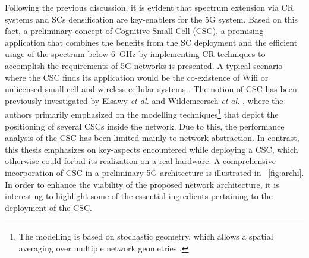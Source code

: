Following the previous discussion, it is evident that spectrum extension via CR systems and SCs densification are key-enablers for the 5G system.
Based on this fact, a preliminary concept of Cognitive Small Cell (CSC), a promising application that combines the benefits from the SC deployment and the efficient usage of the spectrum below \SI{6}{GHz} by implementing CR techniques to accomplish the requirements of 5G networks is presented. A typical scenario where the CSC finds its application would be the co-existence of Wifi or unlicensed small cell and wireless cellular systems \cite{Benn13, Gali15}. The notion of CSC has been previously investigated by Elsawy \textit{et al.} \cite{Elsawy13, Elsawy13_cmag} and Wildemeersch \textit{et al.} \cite{Wild13}, where the authors primarily emphasized on the modelling techniques\footnote{The modelling is based on stochastic geometry, which allows a spatial averaging over multiple network geometries \cite{Haenggi, Haenggi08now}.} that depict the positioning of several CSCs inside the network. Due to this, the performance analysis of the CSC has been limited mainly to network abstraction. In contrast, this thesis emphasizes on key-aspects encountered while deploying a CSC, which otherwise could forbid its realization on a real hardware. %
 A comprehensive incorporation of CSC in a preliminary 5G architecture is illustrated in \figurename~\ref{fig:archi}. In order to enhance the viability of the proposed network architecture, it is interesting to highlight some of the essential ingredients pertaining to the deployment of the CSC.

